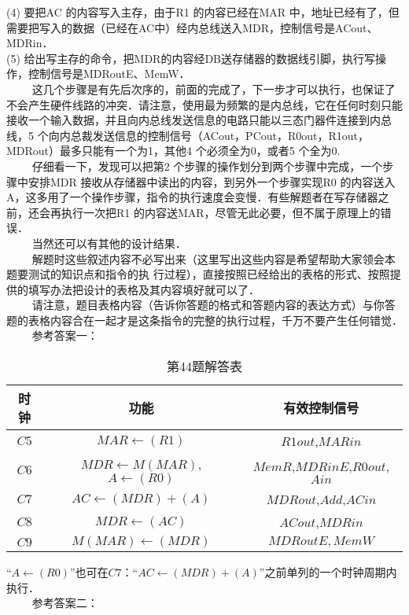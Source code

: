 (4) 要把AC 的内容写入主存，由于R1 的内容已经在MAR 中，地址已经有了，但需要把写入的数据（已经在AC中）经内总线送入MDR，控制信号是ACout、MDRin． \\
(5) 给出写主存的命令，把MDR的内容经DB送存储器的数据线引脚，执行写操作，控制信号是MDRoutE、MemW． \\
$\qquad$ 这几个步骤是有先后次序的，前面的完成了，下一步才可以执行，也保证了不会产生硬件线路的冲突．请注意，使用最为频繁的是内总线，它在任何时刻只能接收一个输入数据，并且向内总线发送信息的电路只能以三态门器件连接到内总线，5 个向内总裁发送信息的控制信号（ACout，PCout，R0out，R1out，MDRout）最多只能有一个为1，其他4 个必须全为0，或者5 个全为0. \\
$\qquad$ 仔细看一下，发现可以把第2 个步骤的操作划分到两个步骤中完成，一个步骤中安排MDR 接收从存储器中读出的内容，到另外一个步骤实现R0 的内容送入A，这多用了一个操作步骤，指令的执行速度会变慢．有些解题者在写存储器之前，还会再执行一次把R1 的内容送MAR，尽管无此必要，但不属于原理上的错误． \\
$\qquad$ 当然还可以有其他的设计结果． \\
$\qquad$ 解题时这些叙述内容不必写出来（这里写出这些内容是希望帮助大家领会本题要测试的知识点和指令的执
行过程），直接按照已经给出的表格的形式、按照提供的填写办法把设计的表格及其内容填好就可以了． \\
$\qquad$ 请注意，题目表格内容（告诉你答题的格式和答题内容的表达方式）与你答题的表格内容合在一起才是这条指令的完整的执行过程，千万不要产生任何错觉． \\
$\qquad$ 参考答案一：
\begin{table}[ht]
\centering
\caption{第44题解答表}\label{CSN09_tab6}
\begin{tabular}{|c|c|c|}
\hline
时钟 & 功能 & 有效控制信号 \\
\hline
$C5$ & $MAR\leftarrow(R1)$ & $R1out$,$MARin$ \\
\hline
$C6$ & $MDR\leftarrow M(MAR)$, $A\leftarrow(R0)$ & $MemR$,$MDRinE$,$R0out$,$Ain$ \\
\hline
$C7$ & $AC\leftarrow(MDR)+(A)$ & $MDRout$,$Add$,$ACin$ \\
\hline
$C8$ & $MDR\leftarrow(AC)$ & $ACout$,$MDRin$ \\
\hline
$C9$ & $M(MAR)\leftarrow(MDR)$ & $MDRoutE,MemW$ \\
\hline
\end{tabular}
\end{table}
“$A\leftarrow(R0)$”也可在$C7$：“$AC\leftarrow(MDR)+(A)$”之前单列的一个时钟周期内执行． \\
$\qquad$ 参考答案二： \\
